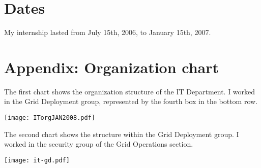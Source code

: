 \documentclass[12pt]{article}
\begin{document}
  \section{Dates}
    My internship lasted from July 15th, 2006, to January 15th, 2007.
    


\newpage
  \section*{Appendix: Organization chart}
    The first chart shows the organization structure of the IT Department.
    I worked in the Grid Deployment group, represented by the fourth box in the
    bottom row.

    \texttt{[image: ITorgJAN2008.pdf]}

    The second chart shows the structure within the Grid Deployment group.
    I worked in the security group of the Grid Operations section.

    \begin{center}
    \texttt{[image: it-gd.pdf]}
    \end{center}
\end{document}
